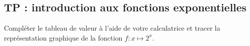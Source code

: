 \documentclass[main.tex]{subfiles}
\begin{document}
%
\newpage 
{}  
\pagestyle{scrheadings} %
\onehalfspacing 
\vspace{-2mm}
\subsection{TP  : introduction aux fonctions exponentielles}	
\noindent Compléter le tableau de valeur à l'aide de votre calculatrice et tracer la représentation graphique de la fonction $f\colon x \mapsto 2^x$.
\end{document}
